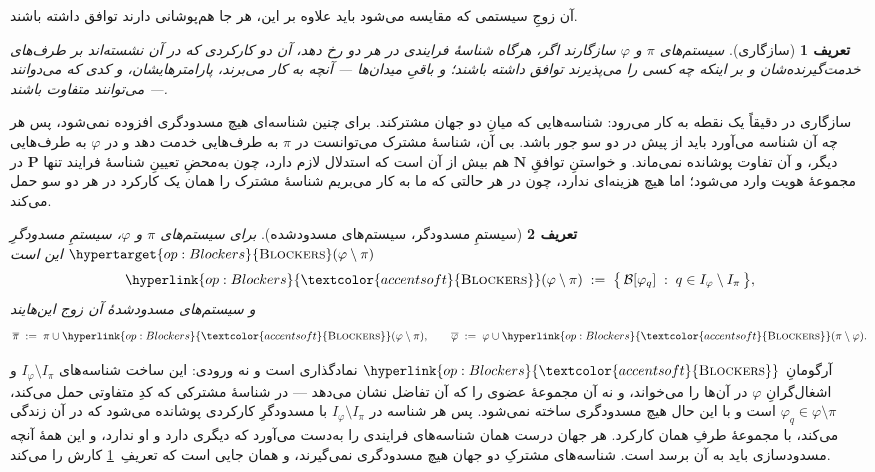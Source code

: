 \documentclass[10pt,oneside,openany]{book}
\newcommand{\Ps}{\mathbf{P}}
\newcommand{\admits}{\mathbf{N}}
\newcommand{\Blk}{\mathcal{B}}
\newcommand{\op}[1]{\textnormal{\textsc{#1}}}
\newcommand{\opdef}[1]{\hypertarget{op:#1}{\op{#1}}}
\newcommand{\opl}[1]{\hyperlink{op:#1}{\textcolor{accentsoft}{\op{#1}}}}
\theoremstyle{accentdef}
\newtheorem{definition}{تعریف}[chapter]
\theoremstyle{accentplain}
\begin{document}
آن زوجِ سیستمی که مقایسه می‌شود باید علاوه بر این، هر جا هم‌پوشانی دارند
توافق داشته باشند.

\begin{definition}[سازگاری]\label{def:compat}
سیستم‌های $\pi$ و $\varphi$ \emph{سازگارند} اگر، هرگاه شناسهٔ فرایندی در
هر دو رخ دهد، آن دو کارکردی که در آن نشسته‌اند بر طرف‌های خدمت‌گیرنده‌شان و
بر اینکه چه کسی را می‌پذیرند توافق داشته باشند؛ و باقیِ میدان‌ها ---
آنچه به کار می‌برند، پارامترهایشان، و کدی که می‌دوانند --- می‌توانند
متفاوت باشند.
\end{definition}

سازگاری در دقیقاً یک نقطه به کار می‌رود: شناسه‌هایی که میانِ دو جهان
مشترکند. برای چنین شناسه‌ای هیچ مسدودگری افزوده نمی‌شود، پس هر چه آن
شناسه می‌آورد باید از پیش در دو سو جور باشد. بی آن، شناسهٔ مشترک می‌توانست
در $\pi$ به طرف‌هایی خدمت دهد و در $\varphi$ به طرف‌هایی دیگر، و آن تفاوت
پوشانده نمی‌ماند. و خواستنِ توافقِ $\admits$ هم بیش از آن است که استدلال
لازم دارد، چون به‌محضِ تعیینِ شناسهٔ فرایند تنها $\Ps$ در مجموعهٔ هویت وارد
می‌شود؛ اما هیچ هزینه‌ای ندارد، چون در هر حالتی که ما به کار می‌بریم شناسهٔ
مشترک را همان یک کارکرد در هر دو سو حمل می‌کند.


\begin{definition}[سیستمِ مسدودگر، سیستم‌های مسدودشده]\label{def:blksys}
برای سیستم‌های $\pi$ و $\varphi$، \emph{سیستمِ مسدودگرِ} $\opdef{Blockers}(\varphi \setminus \pi)$ این است
\[
  \opl{Blockers}(\varphi \setminus \pi) \;:=\; \bigl\{\, \Blk[\varphi_q] \;:\; q \in I_\varphi \setminus I_\pi \,\bigr\},
\]
و \emph{سیستم‌های مسدودشدهٔ} آن زوج این‌هایند
\[
  \overline{\pi} \;:=\; \pi \cup \opl{Blockers}(\varphi \setminus \pi),
  \qquad
  \overline{\varphi} \;:=\; \varphi \cup \opl{Blockers}(\pi \setminus \varphi).
\]
\end{definition}

آرگومانِ $\opl{Blockers}$ نمادگذاری است و نه ورودی: این ساخت شناسه‌های
$I_\varphi \setminus I_\pi$ و اشغال‌گرانِ $\varphi$ در آن‌ها را می‌خواند، و
نه آن مجموعهٔ عضوی را که آن تفاضل نشان می‌دهد --- در شناسهٔ مشترکی که کدِ
متفاوتی حمل می‌کند، $\varphi_q \in \varphi \setminus \pi$ است و با این حال
هیچ مسدودگری ساخته نمی‌شود. پس هر شناسه در $I_\varphi \setminus I_\pi$ با
مسدودگرِ کارکردی پوشانده می‌شود که در آن زندگی می‌کند، با مجموعهٔ طرفِ همان
کارکرد. هر جهان درست همان شناسه‌های فرایندی را به‌دست می‌آورد که دیگری
دارد و او ندارد، و این همهٔ آنچه مسدودسازی باید به آن برسد است. شناسه‌های
مشترکِ دو جهان هیچ مسدودگری نمی‌گیرند، و همان جایی است که
تعریفِ~\ref{def:compat} کارش را می‌کند.
\end{document}
